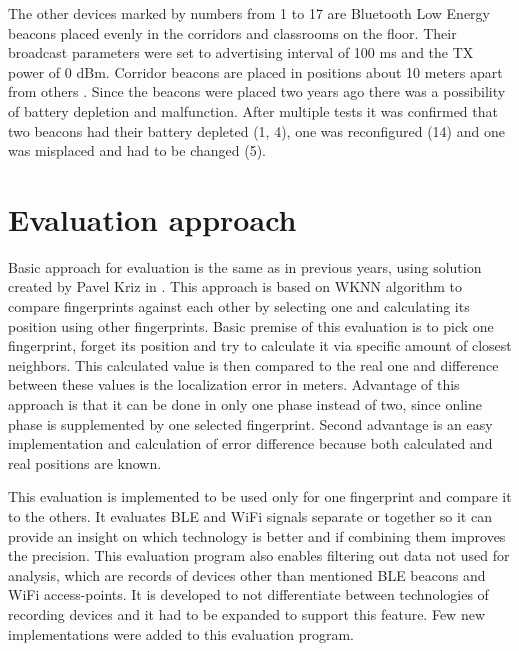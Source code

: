 The other devices marked by numbers from 1 to 17 are Bluetooth Low Energy beacons placed evenly in the corridors and classrooms on the floor. Their broadcast parameters were set to advertising interval of 100 ms and the TX power of 0 dBm. Corridor beacons are placed in positions about 10 meters apart from others \cite{IILUBLEB}. Since the beacons were placed two years ago there was a possibility of battery depletion and malfunction. After multiple tests it was confirmed that two beacons had their battery depleted (1, 4), one was reconfigured (14) and one was misplaced and had to be changed (5).

\section{Evaluation approach}\label{sec:EvaluationApproach}
Basic approach for evaluation is the same as in previous years, using solution created by Pavel Kriz in \cite{IILUBLEB}. This approach is based on WKNN algorithm to compare fingerprints against each other by selecting one and calculating its position using other fingerprints. Basic premise of this evaluation is to pick one fingerprint, forget its position and try to calculate it via specific amount of closest neighbors. This calculated value is then compared to the real one and difference between these values is the localization error in meters. Advantage of this approach is that it can be done in only one phase instead of two, since online phase is supplemented by one selected fingerprint. Second advantage is an easy implementation and calculation of error difference because both calculated and real positions are known.

This evaluation is implemented to be used only for one fingerprint and compare it to the others. It evaluates BLE and WiFi signals separate or together so it can provide an insight on which technology is better and if combining them improves the precision. This evaluation program also enables filtering out data not used for analysis, which are records of devices other than mentioned BLE beacons and WiFi access-points. It is developed to not differentiate between technologies of recording devices and it had to be expanded to support this feature. Few new implementations were added to this evaluation program.

